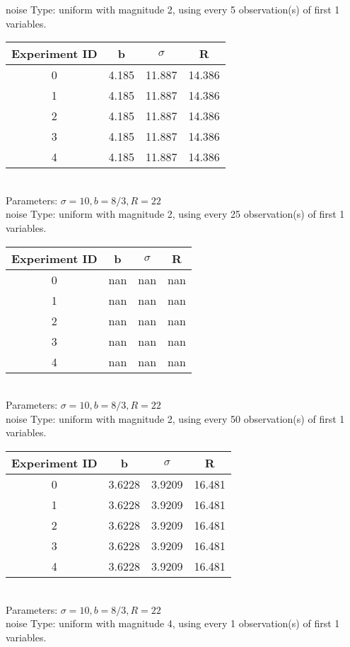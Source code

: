 \begin{multicols}{3}
noise Type: uniform with magnitude 2, using every 5 observation(s) of first 1 variables.\\
\begin{tabular}{cccc}
\hline Experiment ID & b & $\sigma$ & R \\ \hline 
0 & 4.185 & 11.887 & 14.386\\ \hline 
 1 & 4.185 & 11.887 & 14.386\\ \hline 
 2 & 4.185 & 11.887 & 14.386\\ \hline 
 3 & 4.185 & 11.887 & 14.386\\ \hline 
 4 & 4.185 & 11.887 & 14.386\\ \hline 
 \end{tabular}\\
Parameters: $\sigma=10, b=8/3, R=22$\\
noise Type: uniform with magnitude 2, using every 25 observation(s) of first 1 variables.\\
\begin{tabular}{cccc}
\hline Experiment ID & b & $\sigma$ & R \\ \hline 
0 & nan & nan & nan\\ \hline 
 1 & nan & nan & nan\\ \hline 
 2 & nan & nan & nan\\ \hline 
 3 & nan & nan & nan\\ \hline 
 4 & nan & nan & nan\\ \hline 
 \end{tabular}\\
Parameters: $\sigma=10, b=8/3, R=22$\\
noise Type: uniform with magnitude 2, using every 50 observation(s) of first 1 variables.\\
\begin{tabular}{cccc}
\hline Experiment ID & b & $\sigma$ & R \\ \hline 
0 & 3.6228 & 3.9209 & 16.481\\ \hline 
 1 & 3.6228 & 3.9209 & 16.481\\ \hline 
 2 & 3.6228 & 3.9209 & 16.481\\ \hline 
 3 & 3.6228 & 3.9209 & 16.481\\ \hline 
 4 & 3.6228 & 3.9209 & 16.481\\ \hline 
 \end{tabular}\\
Parameters: $\sigma=10, b=8/3, R=22$\\
noise Type: uniform with magnitude 4, using every 1 observation(s) of first 1 variables.\\

\end{multicols}
